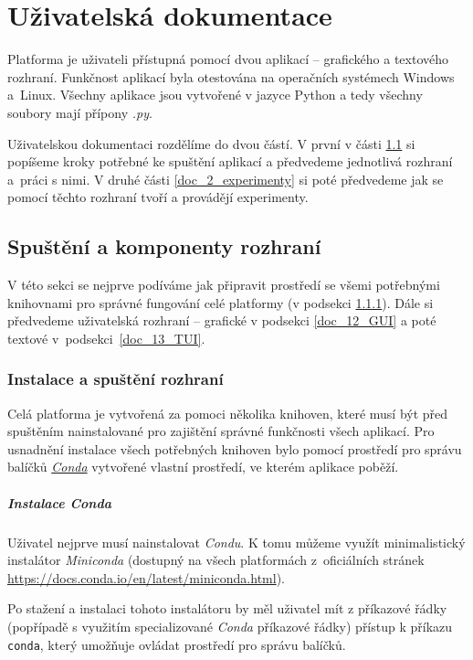 \chapter{Uživatelská dokumentace}
Platforma je uživateli přístupná pomocí dvou aplikací -- grafického a textového
rozhraní. Funkčnost aplikací byla otestována na operačních systémech Windows
a~Linux. Všechny aplikace jsou vytvořené v jazyce Python a tedy všechny soubory
mají přípony \emph{.py}. 

Uživatelskou dokumentaci rozdělíme do dvou částí. V první v části
\ref{doc_1_spust_a_kompon} si popíšeme kroky potřebné ke spuštění aplikací a
předvedeme jednotlivá rozhraní a~práci s nimi. V druhé části
\ref{doc_2_experimenty} si poté předvedeme jak se pomocí těchto rozhraní tvoří
a provádějí experimenty.

\section{Spuštění a komponenty rozhraní} \label{doc_1_spust_a_kompon}

V této sekci se nejprve podíváme jak připravit prostředí se všemi potřebnými
knihovnami pro správné fungování celé platformy (v podsekci
\ref{doc_11_spust}). Dále si předvedeme uživatelská rozhraní -- grafické v
podsekci \ref{doc_12_GUI} a poté textové v~podsekci~\ref{doc_13_TUI}.

\subsection{Instalace a spuštění rozhraní} \label{doc_11_spust}
Celá platforma je vytvořená za pomoci několika knihoven, které musí být před
spuštěním nainstalované pro zajištění správné funkčnosti všech aplikací. Pro
usnadnění instalace všech potřebných knihoven bylo pomocí prostředí pro správu
balíčků \href{https://conda.org/}{\emph{Conda}} vytvořené vlastní prostředí, ve
kterém aplikace poběží. 

\paragraph{Instalace \emph{Conda}}

Uživatel nejprve musí nainstalovat \emph{Condu}. K tomu můžeme využít
minimalistický instalátor \emph{Miniconda} (dostupný na všech platformách
z~oficiálních stránek \url{https://docs.conda.io/en/latest/miniconda.html}).

Po stažení a instalaci tohoto instalátoru by měl uživatel mít z příkazové řádky
(popřípadě s využitím specializované \emph{Conda} příkazové řádky) přístup k
příkazu \texttt{conda}, který umožňuje ovládat prostředí pro správu balíčků. 

